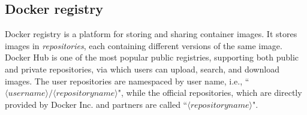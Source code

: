 









\subsection{Docker registry}
\label{sec:docker-registry}

Docker registry is a platform for storing and sharing container
images. It stores images in \emph{repositories}, each containing
different versions of the same image.
%
Docker Hub is one of the most popular public registries,
supporting both public and private repositories,
via which users can upload, search, and download images.
%
%
%
%
%
%
The user repositories are namespaced by user name, i.e.,
``$\langle username\rangle/\langle repository name \rangle$",
while the official repositories, which
are directly provided by Docker Inc. and partners are called
``$\langle repository name \rangle$".
%



